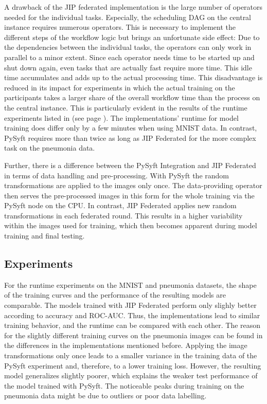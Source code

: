 A drawback of the JIP federated implementation is the large number of operators needed for the individual tasks.
Especially, the scheduling DAG on the central instance requires numerous operators. This is necessary to implement the different steps of the workflow logic but brings an unfortunate side effect: Due to the dependencies between the individual tasks, the operators can only work in parallel to a minor extent.
Since each operator needs time to be started up and shut down again, even tasks that are actually fast require more time.
This idle time accumulates and adds up to the actual processing time. This disadvantage is reduced in its impact for experiments in which the actual training on the participants takes a larger share of the overall workflow time than the process on the central instance.
This is particularly evident in the results of the runtime experiments listed in  (see page \pageref{tab:RuntimeExp}).
The implementations' runtime for model training does differ only by a few minutes when using MNIST data. In contrast, PySyft requires more than twice as long as JIP Federated for the more complex task on the pneumonia data.

Further, there is a difference between the PySyft Integration and JIP Federated in terms of data handling and pre-processing.
With PySyft the random transformations are applied to the images only once. The data-providing operator then serves the pre-processed images in this form for the whole training via the PySyft node on the CPU. In contrast, JIP Federated applies new random transformations in each federated round. This results in a higher variability within the images used for training,
which then becomes apparent during model training and final testing.






\subsection{Experiments}
\label{subsec:DiscussionExperiments}

For the runtime experiments on the MNIST and pneumonia datasets,
the shape of the training curves and the performance of the resulting models are comparable. The models trained with JIP Federated perform only slighly better according to accuracy and ROC-AUC. Thus, the implementations lead to similar training behavior, and the runtime can be compared with each other.
The reason for the slightly different training curves on the pneumonia images can be found in the differences in the implementations mentioned before.
Applying the image transformations only once leads to a smaller variance in the training data of the PySyft experiment and, therefore, to a lower training loss. However, the resulting model generalizes slightly poorer, which explains the weaker test performance of the model trained with PySyft.
The noticeable peaks during training on the pneumonia data might be due to outliers or poor data labelling.

